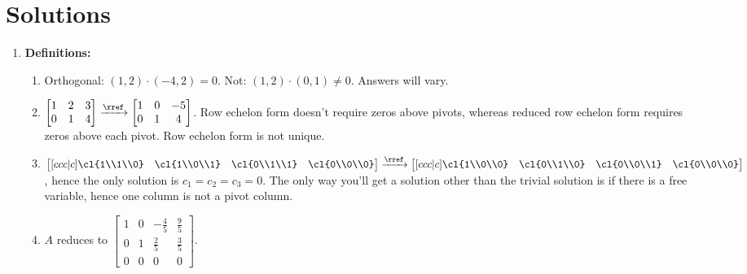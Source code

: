 
\section{Solutions}
{\small
\begin{multicols}{2}

\begin{enumerate}
	\item \textbf{Definitions:}
\begin{enumerate}
	\item Orthogonal: $(1,2)\cdot(-4,2)=0$. Not: $(1,2)\cdot(0,1)\neq 0$. Answers will vary.
	\item $
	\begin{bmatrix}
	1 &2 &3\\ 
	0&1&4
	\end{bmatrix}
	\xrightarrow{\rref}
	\begin{bmatrix}
	1 &0 &-5\\ 
	0 &1 &4
	\end{bmatrix}
	$. Row echelon form doesn't require zeros above pivots, whereas reduced row echelon form requires zeros above each pivot. Row echelon form is not unique.
	\item  
	$
\begin{bmatrix}[ccc|c]
\cl{1\\1\\0}
&\cl{1\\0\\1}
&\cl{0\\1\\1}
&\cl{0\\0\\0}
\end{bmatrix}
\xrightarrow{\rref}
\begin{bmatrix}[ccc|c]
\cl{1\\0\\0}
&\cl{0\\1\\0}
&\cl{0\\0\\1}
&\cl{0\\0\\0}
\end{bmatrix}
$, hence the only solution is $c_1=c_2=c_3=0$. The only way you'll get a solution other than the trivial solution is if there is a free variable, hence one column is not a pivot column.
	\item 
	$A$ reduces to $\begin{bmatrix}
 1 & 0 & -\frac{4}{5} & \frac{9}{5} \\
 0 & 1 & \frac{2}{5} & \frac{3}{5} \\
 0 & 0 & 0 & 0
	\end{bmatrix}$.  
	

\end{enumerate}
\end{enumerate}
\end{multicols}}
